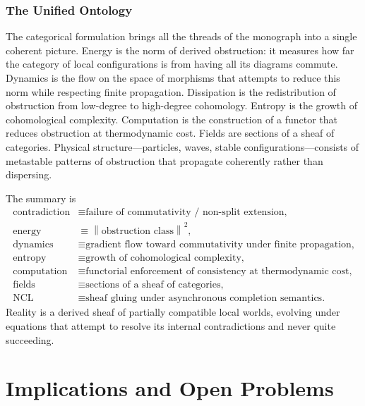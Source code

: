 \documentclass[12pt,a4paper,openany]{book}
\theoremstyle{plain}
\theoremstyle{definition}
\theoremstyle{remark}
\newcommand{\norm}[1]{\left\|#1\right\|}
\begin{document}
\section{The Unified Ontology}

The categorical formulation brings all the threads of the monograph into a single coherent picture. Energy is the norm of derived obstruction: it measures how far the category of local configurations is from having all its diagrams commute. Dynamics is the flow on the space of morphisms that attempts to reduce this norm while respecting finite propagation. Dissipation is the redistribution of obstruction from low-degree to high-degree cohomology. Entropy is the growth of cohomological complexity. Computation is the construction of a functor that reduces obstruction at thermodynamic cost. Fields are sections of a sheaf of categories. Physical structure---particles, waves, stable configurations---consists of metastable patterns of obstruction that propagate coherently rather than dispersing.

The summary is
\begin{align*}
\text{contradiction} &\equiv \text{failure of commutativity / non-split extension,} \\
\text{energy} &\equiv \norm{\text{obstruction class}}^2, \\
\text{dynamics} &\equiv \text{gradient flow toward commutativity under finite propagation,} \\
\text{entropy} &\equiv \text{growth of cohomological complexity,} \\
\text{computation} &\equiv \text{functorial enforcement of consistency at thermodynamic cost,} \\
\text{fields} &\equiv \text{sections of a sheaf of categories,} \\
\text{NCL} &\equiv \text{sheaf gluing under asynchronous completion semantics.}
\end{align*}
Reality is a derived sheaf of partially compatible local worlds, evolving under equations that attempt to resolve its internal contradictions and never quite succeeding.


\part{Implications and Open Problems}
\end{document}
